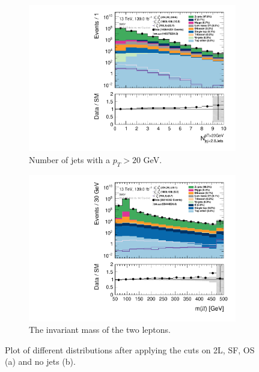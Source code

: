 \begin{figure}[H]
\centering
    \begin{subfigure}[t!]{0.49\textwidth}
        \includegraphics[width=\textwidth]{Figures/SUSYcuts/hist1d_nJet20_SUSY.pdf}
    \caption{Number of jets with a $p_T > 20$ GeV.}
    \label{fig:nJetSUSY}
    \end{subfigure}
    \begin{subfigure}[t!]{0.49\textwidth}
        \includegraphics[width=\textwidth]{Figures/SUSYcuts/hist1d_mll_SUSY.pdf}
    \caption{The invariant mass of the two leptons.}
    \label{fig:mllSUSY}
    \end{subfigure}
    \caption{Plot of different distributions after applying the cuts on 2L, SF, OS (a) and no jets (b).}
    \label{fig:stepsSUSY1}
\end{figure}


